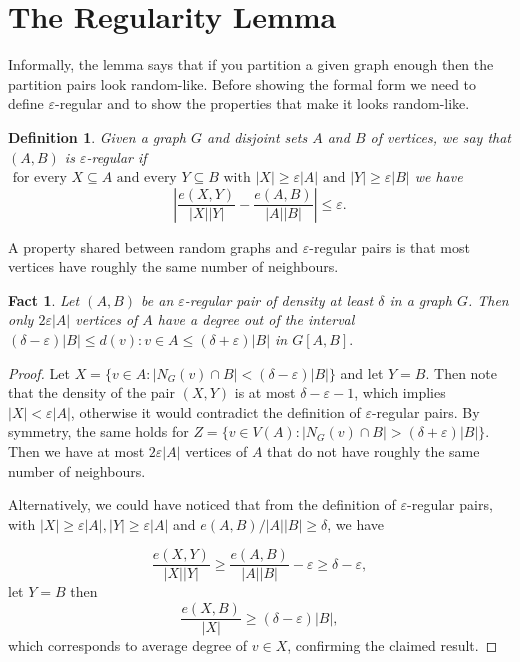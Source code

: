 \documentclass[12pt,twoside,a4paper,bibliography=totocnumbered]{book}
\numberwithin{equation}{section}
\newtheorem{definition}	[theorem] {Definition}
\newtheorem{fact}	[theorem] {Fact}
\theoremstyle{remark}
\begin{document}
\section{The Regularity Lemma}

Informally, the lemma says that if you partition a given graph enough then the partition pairs look random-like. Before showing the formal form we need to define $\varepsilon$-regular and to show the properties that make it looks random-like.

\begin{definition}
Given a graph $G$ and disjoint sets $A$ and $B$ of vertices, we say that $(A,B)$ is $\varepsilon$-regular if $\text{ for every } X \subseteq A \text{ and every } Y \subseteq B\text{ with } |X| \geq \varepsilon|A| \text{ and } |Y| \geq \varepsilon |B|$ we have
$$ \left| \frac{e(X,Y)}{|X||Y|} - \frac{e(A,B)}{|A||B|} \right| \leq \varepsilon  .$$
\end{definition}


A property shared between random graphs and $\varepsilon$-regular pairs is that most vertices have roughly the same number of neighbours.

\begin{fact}\label{fact:503}
Let $(A,B)$ be an $\varepsilon$-regular pair of density at least $\delta$ in a graph $G$. Then only $2 \varepsilon |A| $ vertices of $A$ have a degree out of the interval $(\delta - \varepsilon)|B| \leq d(v) \colon v \in A \leq (\delta + \varepsilon)|B|$ in $G[A,B].$
\end{fact}
\begin{proof}
Let $X = \{v \in A \colon | N_G(v) \cap B | < (\delta-\varepsilon)|B|\}$ and let $Y=B$. Then note that the density of the pair $(X,Y)$ is at most  $\delta - \varepsilon -1$, which implies $|X| < \varepsilon |A|$, otherwise it would contradict the definition of $\varepsilon$-regular pairs. By symmetry, the same holds for $Z = \{ v \in V(A) \colon |N_G(v) \cap B| > (\delta+\varepsilon)|B|\}$. Then we have at most $2 \varepsilon |A| $ vertices of $A$ that do not have roughly the same number of neighbours.

Alternatively, we could have noticed that from the definition of $\varepsilon$-regular pairs, with $|X| \geq \varepsilon|A|, |Y|\geq \varepsilon|A|$ and $e(A,B)/|A||B| \geq \delta $, we have

$$ \frac{e(X,Y)}{|X||Y|} \geq \frac{e(A,B)}{|A||B|} - \varepsilon \geq \delta - \varepsilon,$$
let $Y = B$ then
$$ \frac{e(X,B)}{|X|} \geq (\delta - \varepsilon)|B|,$$
which corresponds to average degree of $v \in X$, confirming the claimed result.
\end{proof}
\end{document}
